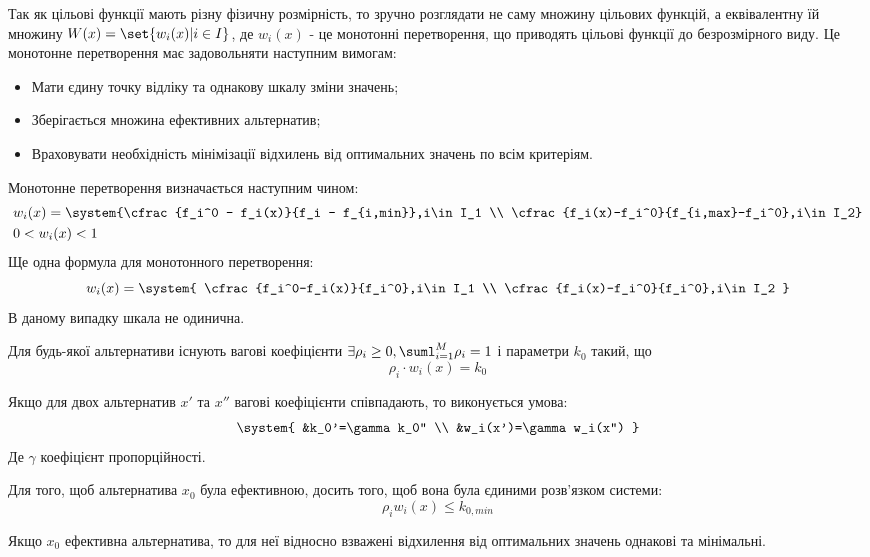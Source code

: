 Так як цільові функції мають різну фізичну розмірність, то зручно розглядати не саму множину цільових функцій, а еквівалентну їй множину $W(x)=\set{w_i(x)|i\in I}$, де $w_i(x)$ - це монотонні перетворення, що приводять цільові функції до безрозмірного виду. Це монотонне перетворення має задовольняти наступним вимогам:
\begin{itemize}
\item Мати єдину точку відліку та однакову шкалу зміни значень;
\item Зберігається множина ефективних альтернатив;
\item Враховувати необхідність мінімізації відхилень від оптимальних значень по всім критеріям.
\end{itemize}
Монотонне перетворення визначається наступним чином:
\begin{eqnarray}
&w_i(x) = \system{\cfrac{f_i^0 - f_i(x)}{f_i - f_{i,min}},i\in I_1 \\ \cfrac{f_i(x)-f_i^0}{f_{i,max}-f_i^0},i\in I_2}\label{tr:1:6} \\
&0<w_i(x)<1 \nonumber
\end{eqnarray}
Ще одна формула для монотонного перетворення:
\begin{equation}
w_i(x) = \system{
\cfrac{f_i^0-f_i(x)}{f_i^0},i\in I_1 \\
\cfrac{f_i(x)-f_i^0}{f_i^0},i\in I_2
}
\end{equation}
В даному випадку шкала не одинична.
\begin{teor}
Для будь-якої альтернативи існують вагові коефіцієнти $\exists \rho_i\geq 0,\suml_{i=1}^M \rho_i=1$ і параметри $k_0$ такий, що 
\begin{equation}
\rho_i\cdot w_i(x) = k_0
\end{equation}
\end{teor}
\begin{teor}
Якщо для двох альтернатив $x'$ та $x''$ вагові коефіцієнти співпадають, то виконується умова:
\begin{equation}
\system{
&k_0'=\gamma k_0'' \\
&w_i(x')=\gamma w_i(x'')
}
\end{equation}
Де $\gamma$ коефіцієнт пропорційності.
\end{teor}
\begin{teor}
Для того, щоб альтернатива $x_0$ була ефективною, досить того, щоб вона була єдиними розв’язком системи:
\begin{equation}
\rho_i w_i(x) \leq k_{0,min}
\end{equation}
\end{teor}
\begin{teor}\label{tr:1:7}
Якщо $x_0$ ефективна альтернатива, то для неї відносно взважені відхилення від оптимальних значень однакові та мінімальні.
\end{teor}

